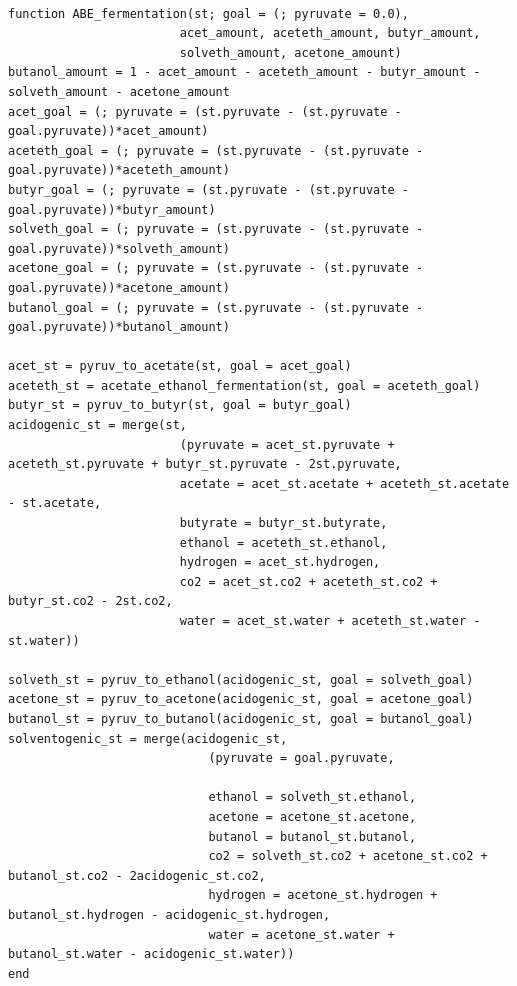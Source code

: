 \documentclass[11pt]{article}
\begin{document}
\begin{verbatim}

function ABE_fermentation(st; goal = (; pyruvate = 0.0),
                        acet_amount, aceteth_amount, butyr_amount,
                        solveth_amount, acetone_amount)
butanol_amount = 1 - acet_amount - aceteth_amount - butyr_amount - solveth_amount - acetone_amount
acet_goal = (; pyruvate = (st.pyruvate - (st.pyruvate - goal.pyruvate))*acet_amount)
aceteth_goal = (; pyruvate = (st.pyruvate - (st.pyruvate - goal.pyruvate))*aceteth_amount)
butyr_goal = (; pyruvate = (st.pyruvate - (st.pyruvate - goal.pyruvate))*butyr_amount)
solveth_goal = (; pyruvate = (st.pyruvate - (st.pyruvate - goal.pyruvate))*solveth_amount)
acetone_goal = (; pyruvate = (st.pyruvate - (st.pyruvate - goal.pyruvate))*acetone_amount)
butanol_goal = (; pyruvate = (st.pyruvate - (st.pyruvate - goal.pyruvate))*butanol_amount)

acet_st = pyruv_to_acetate(st, goal = acet_goal)
aceteth_st = acetate_ethanol_fermentation(st, goal = aceteth_goal)
butyr_st = pyruv_to_butyr(st, goal = butyr_goal)
acidogenic_st = merge(st,
                        (pyruvate = acet_st.pyruvate + aceteth_st.pyruvate + butyr_st.pyruvate - 2st.pyruvate,
                        acetate = acet_st.acetate + aceteth_st.acetate - st.acetate,
                        butyrate = butyr_st.butyrate,
                        ethanol = aceteth_st.ethanol,
                        hydrogen = acet_st.hydrogen,
                        co2 = acet_st.co2 + aceteth_st.co2 + butyr_st.co2 - 2st.co2,
                        water = acet_st.water + aceteth_st.water - st.water))

solveth_st = pyruv_to_ethanol(acidogenic_st, goal = solveth_goal)
acetone_st = pyruv_to_acetone(acidogenic_st, goal = acetone_goal)
butanol_st = pyruv_to_butanol(acidogenic_st, goal = butanol_goal)
solventogenic_st = merge(acidogenic_st,
                            (pyruvate = goal.pyruvate,

                            ethanol = solveth_st.ethanol,
                            acetone = acetone_st.acetone,
                            butanol = butanol_st.butanol,
                            co2 = solveth_st.co2 + acetone_st.co2 + butanol_st.co2 - 2acidogenic_st.co2,
                            hydrogen = acetone_st.hydrogen + butanol_st.hydrogen - acidogenic_st.hydrogen,
                            water = acetone_st.water + butanol_st.water - acidogenic_st.water))
end

\end{verbatim}
\end{document}
